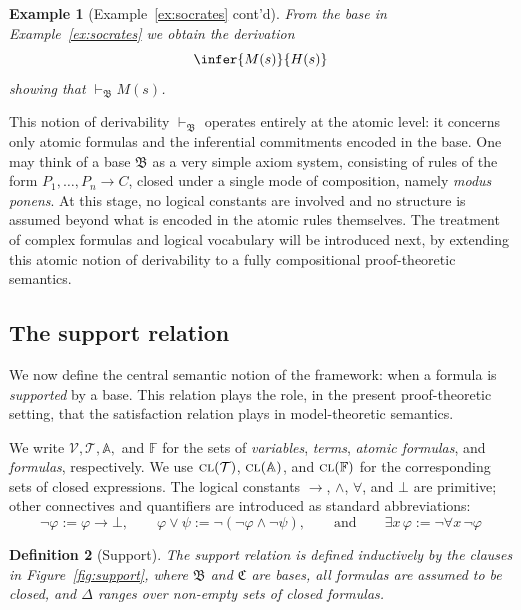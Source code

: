 \documentclass[reqno]{asl}
\newtheorem{definition}{Definition}
\newtheorem{example}[definition]{Example}
\newcommand{\setVar}{\mathcal{V}}
\newcommand{\setTerm}{\mathcal{T}}
\newcommand{\closure}{\textsc{cl}}
\newcommand{\setClosedTerm}{\closure(\setTerm)}
\newcommand{\setClosedAtom}
{\closure(\setAtoms)}
\newcommand{\setClosedFormulas}{\closure(\setFormulas)}
\newcommand{\setAtoms}{\mathbb{A}}
\newcommand{\setFormulas}{\mathbb{F}}
\newcommand{\proves}{\vdash}
\newcommand{\base}[1]{\mathfrak{#1}}
\begin{document}
\begin{example}[Example~\ref{ex:socrates} cont'd]
From the base in Example~\ref{ex:socrates} we obtain the derivation
\[
\infer{M(s)}{H(s)}
\]
showing that $\proves_{\base{B}} M(s)$.
\end{example}

This notion of derivability $\vdash_{\base{B}}$ operates entirely at the atomic level: it concerns only atomic formulas and the inferential commitments encoded in the base. One may think of a base $\base{B}$ as a very simple axiom system, consisting of rules of the form $P_1, \ldots, P_n \to C$, closed under a single mode of composition, namely \emph{modus ponens}. At this stage, no logical constants are involved and no structure is assumed beyond what is encoded in the atomic rules themselves. The treatment of complex formulas and logical vocabulary will be introduced next, by extending this atomic notion of derivability to a fully compositional proof-theoretic semantics.

\subsection{The support relation}

We now define the central semantic notion of the framework: when a formula is \emph{supported} by a base. This relation plays the role, in the present proof-theoretic setting, that the satisfaction relation plays in model-theoretic semantics.

We write $\setVar, \setTerm, \setAtoms,$ and $\setFormulas$ for the sets of \emph{variables}, \emph{terms}, \emph{atomic formulas}, and \emph{formulas}, respectively. We use $\setClosedTerm$, $\setClosedAtom$, and $\setClosedFormulas$ for the corresponding sets of closed expressions. The logical constants $\to$, $\land$, $\forall$, and $\bot$ are primitive; other connectives and quantifiers are introduced as standard abbreviations: 
\[
\neg \varphi := \varphi \to \bot, \qquad \varphi \lor \psi := \neg(\neg \varphi \land \neg \psi), \qquad \text{and} \qquad \exists x\,\varphi := \neg \forall x\,\neg \varphi
\]


\begin{definition}[Support]\label{def:supp}
The support relation is defined inductively by the clauses in Figure~\ref{fig:support}, where $\base{B}$ and $\base{C}$ are bases, all formulas are assumed to be closed, and $\Delta$ ranges over non-empty sets of closed formulas.
\end{definition}
\end{document}

